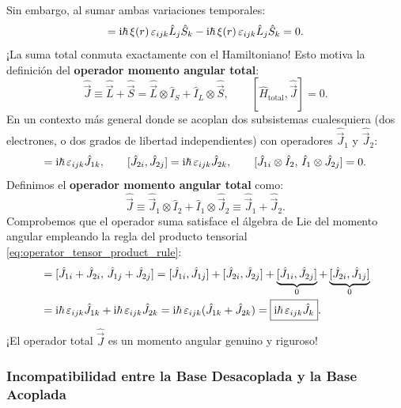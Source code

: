 Sin embargo, al sumar ambas variaciones temporales:
\begin{equation}
    [\hat{H}_{SO}, \, \hat{L}_i + \hat{S}_i] = \iu\hbar\,\xi(r)\,\varepsilon_{ijk}\hat{L}_j\hat{S}_k - \iu\hbar\,\xi(r)\,\varepsilon_{ijk}\hat{L}_j\hat{S}_k = 0.
\end{equation}
¡La suma total conmuta exactamente con el Hamiltoniano! Esto motiva la definición del \textbf{operador momento angular total}:
\begin{equation}
    \boxed{\hat{\vec{J}} \equiv \hat{\vec{L}} + \hat{\vec{S}} = \hat{\vec{L}} \otimes \hat{I}_S + \hat{I}_L \otimes \hat{\vec{S}}}, \qquad [\hat{H}_{\text{total}}, \hat{\vec{J}}] = 0.
\end{equation}
En un contexto más general donde se acoplan dos subsistemas cualesquiera (dos electrones, o dos grados de libertad independientes) con operadores $\hat{\vec{J}}_1$ y $\hat{\vec{J}}_2$:
\begin{equation}
    [\hat{J}_{1i}, \hat{J}_{1j}] = \iu\hbar\,\varepsilon_{ijk}\hat{J}_{1k}, \qquad [\hat{J}_{2i}, \hat{J}_{2j}] = \iu\hbar\,\varepsilon_{ijk}\hat{J}_{2k}, \qquad [\hat{J}_{1i} \otimes \hat{I}_2, \, \hat{I}_1 \otimes \hat{J}_{2j}] = 0.
\end{equation}
Definimos el \textbf{operador momento angular total} como:
\begin{equation}
    \boxed{\hat{\vec{J}} \equiv \hat{\vec{J}}_1 \otimes \hat{I}_2 + \hat{I}_1 \otimes \hat{\vec{J}}_2 \equiv \hat{\vec{J}}_1 + \hat{\vec{J}}_2}.
\end{equation}
Comprobemos que el operador suma satisface el álgebra de Lie del momento angular empleando la regla del producto tensorial \eqref{eq:operator_tensor_product_rule}:
\begin{align}
    [\hat{J}_i, \hat{J}_j] &= [\hat{J}_{1i} + \hat{J}_{2i}, \, \hat{J}_{1j} + \hat{J}_{2j}] = [\hat{J}_{1i}, \hat{J}_{1j}] + [\hat{J}_{2i}, \hat{J}_{2j}] + \underbrace{[\hat{J}_{1i}, \hat{J}_{2j}]}_{0} + \underbrace{[\hat{J}_{2i}, \hat{J}_{1j}]}_{0} \nonumber\\
    &= \iu\hbar\,\varepsilon_{ijk}\hat{J}_{1k} + \iu\hbar\,\varepsilon_{ijk}\hat{J}_{2k} = \iu\hbar\,\varepsilon_{ijk}(\hat{J}_{1k} + \hat{J}_{2k}) = \boxed{\iu\hbar\,\varepsilon_{ijk}\hat{J}_k}.
\end{align}
¡El operador total $\hat{\vec{J}}$ es un momento angular genuino y riguroso!

\subsubsection{Incompatibilidad entre la Base Desacoplada y la Base Acoplada}

